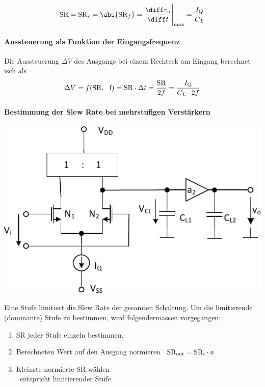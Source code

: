 \[
    \text{SR} = \text{SR}_r = \abs{\text{SR}_f} = \frac{\diff v_o}{\diff t} \Bigg|_{\rm max} = \frac{I_Q}{C_L}
\]
\paragraph{Aussteuerung als Funktion der Eingangsfrequenz}
Die Aussteuerung $\Delta V$ des Ausgangs bei einem Rechteck am Eingang berechnet isch als %
\[
    \Delta V = f(\text{SR, \, f}) = \text{SR} \cdot \Delta t = \frac{\text{SR}}{2 f} = \frac{I_Q}{C_L \cdot 2 f}
\]


\paragraph{Bestimmung der Slew Rate bei mehrstufigen Verstärkern}

\begin{minipage}[t]{0.46\columnwidth}
    \includegraphics[width=\columnwidth, align=t]{images/09_slew_rate.pdf}
\end{minipage}
\hfill
\begin{minipage}[t]{0.5\columnwidth}
    Eine Stufe limitiert die Slew Rate der gesamten Schaltung. 
    Um die limitierende (dominante) Stufe zu bestimmen, wird folgendermassen vorgegangen:

    \smallskip

    \begin{enumerate}
        \item SR jeder Stufe einzeln bestimmen.
        \item Berechneten Wert auf den Ausgang normieren \textrightarrow\ $\text{SR}_{\rm out} = \text{SR}_i \cdot a$
        \item Kleinste normierte SR wählen \\
            \textrightarrow\ entspricht limitierender Stufe
    \end{enumerate}
\end{minipage}


